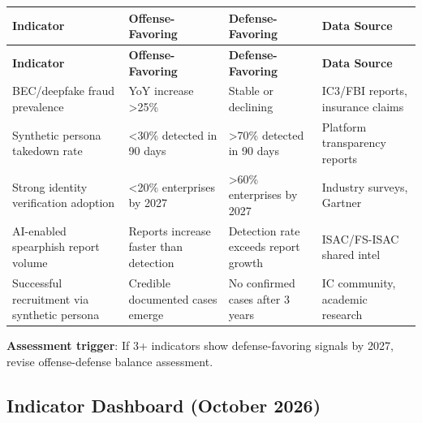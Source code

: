 \documentclass[11pt,letterpaper]{article}
\begin{document}
{\small
\begin{longtable}{L{3cm}L{3.5cm}L{3.5cm}L{3cm}}
\toprule
\textbf{Indicator} & \textbf{Offense-Favoring} & \textbf{Defense-Favoring} & \textbf{Data Source} \\
\midrule
\endfirsthead
\toprule
\textbf{Indicator} & \textbf{Offense-Favoring} & \textbf{Defense-Favoring} & \textbf{Data Source} \\
\midrule
\endhead
BEC/deepfake fraud prevalence & YoY increase >25\% & Stable or declining & IC3/FBI reports, insurance claims \\*
Synthetic persona takedown rate & <30\% detected in 90 days & >70\% detected in 90 days & Platform transparency reports \\
Strong identity verification adoption & <20\% enterprises by 2027 & >60\% enterprises by 2027 & Industry surveys, Gartner \\
AI-enabled spearphish report volume & Reports increase faster than detection & Detection rate exceeds report growth & ISAC/FS-ISAC shared intel \\*
Successful recruitment via synthetic persona & Credible documented cases emerge & No confirmed cases after 3 years & IC community, academic research \\
\bottomrule
\end{longtable}}

\textbf{Assessment trigger}: If 3+ indicators show defense-favoring signals by 2027, revise offense-defense balance assessment.

\subsection{Indicator Dashboard (October 2026)}
\end{document}
